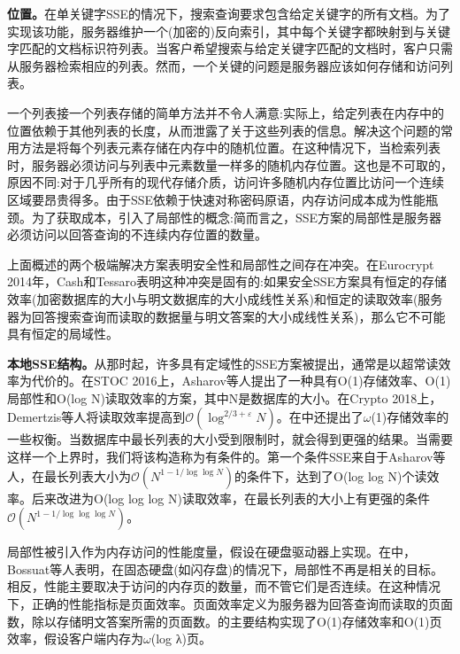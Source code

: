 \documentclass[UTF8]{article}
\begin{document}
\textbf{位置。}在单关键字SSE的情况下，搜索查询要求包含给定关键字的所有文档。为了实现该功能，服务器维护一个(加密的)反向索引，其中每个关键字都映射到与关键字匹配的文档标识符列表。当客户希望搜索与给定关键字匹配的文档时，客户只需从服务器检索相应的列表。然而，一个关键的问题是服务器应该如何存储和访问列表。

一个列表接一个列表存储的简单方法并不令人满意:实际上，给定列表在内存中的位置依赖于其他列表的长度，从而泄露了关于这些列表的信息。解决这个问题的常用方法是将每个列表元素存储在内存中的随机位置。在这种情况下，当检索列表时，服务器必须访问与列表中元素数量一样多的随机内存位置。这也是不可取的，原因不同:对于几乎所有的现代存储介质，访问许多随机内存位置比访问一个连续区域要昂贵得多。由于SSE依赖于快速对称密码原语，内存访问成本成为性能瓶颈。为了获取成本，\cite{DavidCash2014TheLO}引入了局部性的概念:简而言之，SSE方案的局部性是服务器必须访问以回答查询的不连续内存位置的数量。

上面概述的两个极端解决方案表明安全性和局部性之间存在冲突。在Eurocrypt 2014年，Cash和Tessaro表明这种冲突是固有的\cite{DavidCash2014TheLO}:如果安全SSE方案具有恒定的存储效率(加密数据库的大小与明文数据库的大小成线性关系)和恒定的读取效率(服务器为回答搜索查询而读取的数据量与明文答案的大小成线性关系)，那么它不可能具有恒定的局域性。

\textbf{本地SSE结构。}从那时起，许多具有定域性的SSE方案被提出，通常是以超常读效率为代价的。在STOC 2016上，Asharov等人提出了一种具有O(1)存储效率、O(1)局部性和O(log N)读取效率的方案，其中N是数据库的大小\cite{GiladAsharov2021SearchableSE}。在Crypto 2018上，Demertzis等人将读取效率提高到$\mathcal{O}\left(\log ^{2 / 3+\varepsilon} N\right)$\cite{IoannisDemertzis2018SearchableEW}。在\cite{IoannisDemertzis2017FastSE}中还提出了$\omega$(1)存储效率的一些权衡。当数据库中最长列表的大小受到限制时，就会得到更强的结果。当需要这样一个上界时，我们将该构造称为有条件的。第一个条件SSE来自于Asharov等人，在最长列表大小为$\mathcal{O}\left(N^{1-1 / \log \log N}\right)$的条件下，达到了O(log log N)个读效率。后来改进为O(log log log N)读取效率，在最长列表的大小上有更强的条件$\mathcal{O}\left(N^{1-1 / \log \log \log N}\right)$。

局部性被引入作为内存访问的性能度量，假设在硬盘驱动器上实现。在\cite{AngleBossuat2021SSEAS}中，Bossuat等人表明，在固态硬盘(如闪存盘)的情况下，局部性不再是相关的目标。相反，性能主要取决于访问的内存页的数量，而不管它们是否连续。在这种情况下，正确的性能指标是页面效率。页面效率定义为服务器为回答查询而读取的页面数，除以存储明文答案所需的页面数。\cite{AngleBossuat2021SSEAS}的主要结构实现了O(1)存储效率和O(1)页效率，假设客户端内存为$\omega$(log λ)页。
\end{document}
